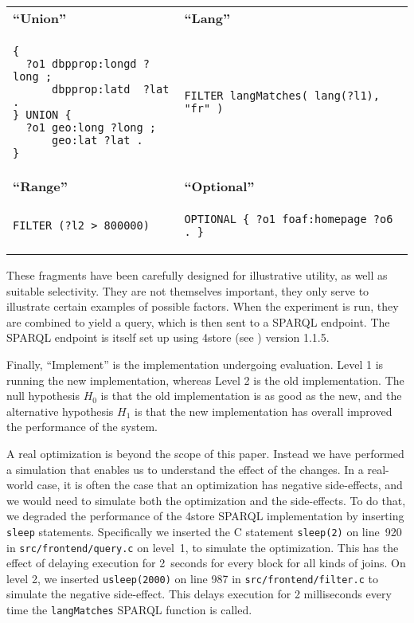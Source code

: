 \documentclass{llncs}
\begin{document}
\begin{center}\small
  \begin{tabular}{|@{~~}p{}|@{~~}p{}|}
    \hline
    \textbf{``Union''} & \textbf{``Lang''} \\[-2ex]
    \begin{verbatim}
{
  ?o1 dbpprop:longd ?long ;
      dbpprop:latd  ?lat .
} UNION {
  ?o1 geo:long ?long ;
      geo:lat ?lat .
}\end{verbatim} 
&
\begin{verbatim}
FILTER langMatches( lang(?l1), "fr" ) 
\end{verbatim} 
\\    \hline
    \textbf{``Range''} & \textbf{``Optional''} \\[-2ex]
    \begin{verbatim}
FILTER (?l2 > 800000)\end{verbatim} 
 & 
    \begin{verbatim}
OPTIONAL { ?o1 foaf:homepage ?o6 . }\end{verbatim} 
\\    \hline
  \end{tabular}
\end{center}
These fragments have been carefully designed for illustrative utility,
as well as suitable selectivity. They are not themselves important,
they only serve to illustrate certain examples of possible
factors. When the experiment is run, they are combined to yield a
query, which is then sent to a SPARQL endpoint. The SPARQL endpoint is
itself set up using 4store (see \cite{harris20094store}) version
1.1.5. 

Finally, ``Implement'' is the implementation undergoing
evaluation. Level 1 is running the new implementation, whereas Level 2
is the old implementation. The null hypothesis $H_0$ is that the old
implementation is as good as the new, and the alternative hypothesis
$H_1$ is that the new implementation has overall improved the
performance of the system.

A real optimization is beyond the scope of this paper. Instead we have
performed a simulation that enables us to understand the effect of the
changes.  In a real-world case, it is often the case that an
optimization has negative side-effects, and we would need to simulate
both the optimization and the side-effects. To do that, we degraded
the performance of the 4store SPARQL implementation by inserting
\texttt{sleep} statements. Specifically we inserted the C statement
\texttt{sleep(2)} on line~920 in \texttt{src/frontend/query.c} on
level~1, to simulate the optimization. This has the effect of delaying
execution for 2~seconds for every block for all kinds of joins. On
level 2, we inserted \texttt{usleep(2000)} on line 987 in
\texttt{src/frontend/filter.c} to simulate the negative
side-effect. This delays execution for 2 milliseconds every time the
\texttt{langMatches} SPARQL function is called.
\end{document}
